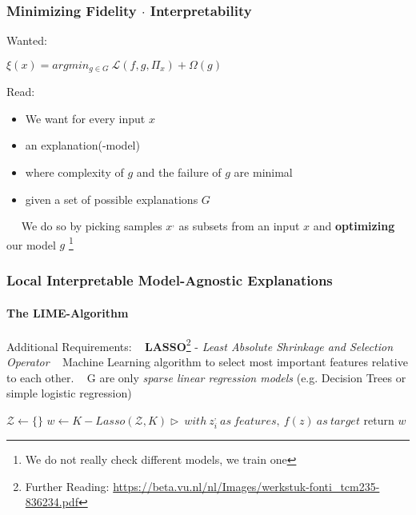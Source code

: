 \begin{frame}
	\frametitle{Minimizing Fidelity $\cdot$ Interpretability}
	\begin{Large}
		Wanted: ~\newline
		\begin{center}
			$\xi(x) = argmin_{g\in G} ~ \mathcal{L}(f,g,\Pi_x) + \Omega(g)$
		\end{center}
		Read: 
		\begin{itemize}
			\item We want for every input $x$
			\item an explanation(-model)
			\item where complexity of $g$ and the failure of $g$ are minimal
			\item given a set of possible explanations $G$
		\end{itemize}
	\end{Large}
~\newline ~\newline 
We do so by picking samples $x^,$ as subsets from an input $x$ and \textbf{optimizing} our model $g$ \footnote{We do not really check different models, we train one} 
\end{frame}

\begin{frame}
	\frametitle{Local Interpretable Model-Agnostic Explanations}
	\framesubtitle{The LIME-Algorithm}
	Additional Requirements: ~\newline 
	\textbf{LASSO}\footnote{Further Reading: \url{https://beta.vu.nl/nl/Images/werkstuk-fonti_tcm235-836234.pdf}} - \textit{Least Absolute Shrinkage and Selection Operator} ~\newline 
	Machine Learning algorithm to select most important features relative to each other. ~\newline
	G are only \textit{sparse linear regression models} (e.g. Decision Trees or simple logistic regression) ~\newline 
	
	\begin{algorithm}[H]
		$\mathcal{Z} \leftarrow \{\}$\;
		$ w \leftarrow K-Lasso(\mathcal{Z},K)  \triangleright~ with~ z^,_i~ as~ features,~ f(z) ~ as ~ target$\;
		return  $w$\;
	\end{algorithm}

\end{frame}